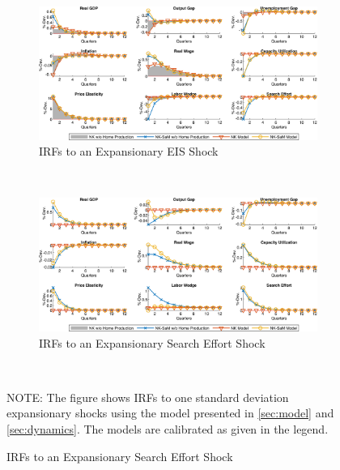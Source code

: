 \documentclass[12pt,3p,authoryear,review]{elsarticle}
\begin{document}
\begin{figure}[h!]%
    \centering%
    \caption{Dropping Home Production - IRFs to Expansionary Cost Push Shocks}\label{fig:app_irf_robust_hw_2}%
    \begin{subfigure}{\textwidth}%
        \centering%
        \caption{IRFs to an Expansionary EIS Shock}%
        \includegraphics[width=\textwidth]{fig_21_irf_robust_comparison_eis.png}%
    \end{subfigure}\\%
	\vspace{0.2in}%
    \begin{subfigure}{\textwidth}%
        \centering%
        \caption{IRFs to an Expansionary Search Effort Shock}%
        \includegraphics[width=\textwidth]{fig_22_irf_robust_comparison_search.png}%
    \end{subfigure}\\%
    {\tiny \singlespacing NOTE: The figure shows IRFs to one standard deviation expansionary shocks using the model presented in \cref{sec:model} and \cref{sec:dynamics}. The models are calibrated as given in the legend.\par}%
\end{figure}%
\FloatBarrier%
\end{document}
